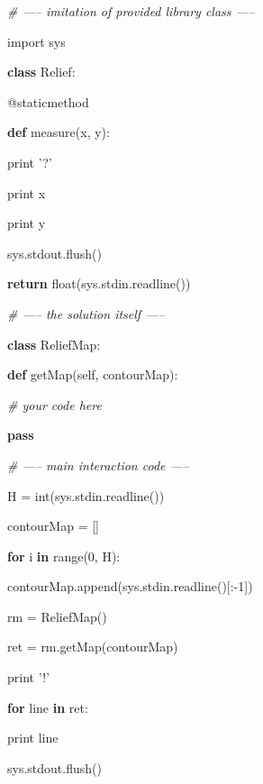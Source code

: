\documentclass[]{article}
\newenvironment{Shaded}{}{}
\newcommand{\AttributeTok}[1]{\textcolor[rgb]{0.49,0.56,0.16}{#1}}
\newcommand{\BuiltInTok}[1]{#1}
\newcommand{\CommentTok}[1]{\textcolor[rgb]{0.38,0.63,0.69}{\textit{#1}}}
\newcommand{\ControlFlowTok}[1]{\textcolor[rgb]{0.00,0.44,0.13}{\textbf{#1}}}
\newcommand{\DecValTok}[1]{\textcolor[rgb]{0.25,0.63,0.44}{#1}}
\newcommand{\ImportTok}[1]{#1}
\newcommand{\KeywordTok}[1]{\textcolor[rgb]{0.00,0.44,0.13}{\textbf{#1}}}
\newcommand{\NormalTok}[1]{#1}
\newcommand{\OperatorTok}[1]{\textcolor[rgb]{0.40,0.40,0.40}{#1}}
\newcommand{\StringTok}[1]{\textcolor[rgb]{0.25,0.44,0.63}{#1}}
\newcommand{\VariableTok}[1]{\textcolor[rgb]{0.10,0.09,0.49}{#1}}
\begin{document}
\begin{Shaded}
\begin{Highlighting}[]

\CommentTok{# ----- imitation of provided library class -----}

\ImportTok{import}\NormalTok{ sys}

\KeywordTok{class}\NormalTok{ Relief:}

   \AttributeTok{@staticmethod}

   \KeywordTok{def}\NormalTok{ measure(x, y):}

       \BuiltInTok{print} \StringTok{'?'}

       \BuiltInTok{print}\NormalTok{ x}

       \BuiltInTok{print}\NormalTok{ y}

\NormalTok{       sys.stdout.flush()}

       \ControlFlowTok{return} \BuiltInTok{float}\NormalTok{(sys.stdin.readline())    }

\CommentTok{# ----- the solution itself -----}

\KeywordTok{class}\NormalTok{ ReliefMap:}

   \KeywordTok{def}\NormalTok{ getMap(}\VariableTok{self}\NormalTok{, contourMap):}

       \CommentTok{# your code here}

       \ControlFlowTok{pass}

\CommentTok{# ----- main interaction code -----}

\NormalTok{H }\OperatorTok{=} \BuiltInTok{int}\NormalTok{(sys.stdin.readline())}

\NormalTok{contourMap }\OperatorTok{=}\NormalTok{ []}

\ControlFlowTok{for}\NormalTok{ i }\KeywordTok{in} \BuiltInTok{range}\NormalTok{(}\DecValTok{0}\NormalTok{, H):}

\NormalTok{   contourMap.append(sys.stdin.readline()[:}\OperatorTok{-}\DecValTok{1}\NormalTok{])}

\NormalTok{rm }\OperatorTok{=}\NormalTok{ ReliefMap()}

\NormalTok{ret }\OperatorTok{=}\NormalTok{ rm.getMap(contourMap)}

\BuiltInTok{print} \StringTok{'!'}

\ControlFlowTok{for}\NormalTok{ line }\KeywordTok{in}\NormalTok{ ret:}

   \BuiltInTok{print}\NormalTok{ line}

\NormalTok{   sys.stdout.flush()}
\end{Highlighting}
\end{Shaded}
\end{document}
